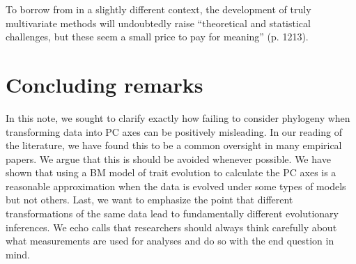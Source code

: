 \documentclass[a4paper,12pt]{article}
\begin{document}
To borrow from \citet{HansenHoule2008} in a slightly different context, the development of truly multivariate methods will undoubtedly raise ``theoretical and statistical challenges, but these seem a small price to pay for meaning'' (p. 1213).

\section{Concluding remarks}
In this note, we sought to clarify exactly how failing to consider phylogeny when transforming data into PC axes can be positively misleading. In our reading of the literature, we have found this to be a common oversight in many empirical papers. We argue that this is should be avoided whenever possible. We have shown that using a BM model of trait evolution to calculate the PC axes is a reasonable approximation when the data is evolved under some types of models but not others. Last, we want to emphasize the point that different transformations of the same data lead to fundamentally different evolutionary inferences. We echo calls \citep{HansenHoule2008, Houle2011} that researchers should always think carefully about what measurements are used for analyses and do so with the end question in mind.



\end{document}
